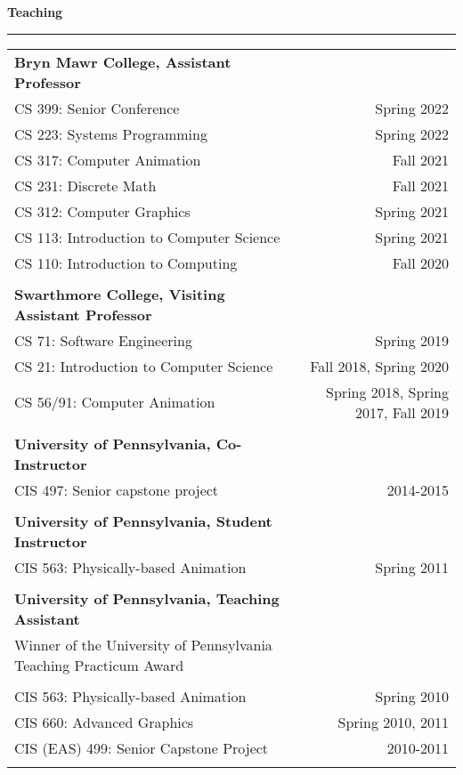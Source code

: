 \needspace{6em}
{\large {\bf Teaching}}
\vspace{0.1cm}
\hrule
\begin{tabular*}{7.1in}{@{}l@{\extracolsep\fill}r}

{\bf Bryn Mawr College, Assistant Professor} & \\
CS 399: Senior Conference & Spring 2022\\
CS 223: Systems Programming & Spring 2022\\
CS 317: Computer Animation & Fall 2021\\
CS 231: Discrete Math & Fall 2021\\
CS 312: Computer Graphics & Spring 2021\\
CS 113: Introduction to Computer Science & Spring 2021\\
CS 110: Introduction to Computing & Fall 2020\\
\phantom{yommomma} & \phantom{2002}\\

{\bf Swarthmore College, Visiting Assistant Professor} & \\
CS 71: Software Engineering & Spring 2019\\
CS 21: Introduction to Computer Science & Fall 2018, Spring 2020\\
CS 56/91: Computer Animation & Spring 2018, Spring 2017, Fall 2019\\
\phantom{yommomma} & \phantom{2002}\\

{\bf University of Pennsylvania, Co-Instructor} & \\
CIS 497: Senior capstone project & 2014-2015\\
\phantom{yommomma} & \phantom{2002}\\

{\bf University of Pennsylvania, Student Instructor} & \\
CIS 563: Physically-based Animation & Spring 2011\\
\phantom{yommomma} & \phantom{2002}\\
{\bf University of Pennsylvania, Teaching Assistant} & \\
Winner of the University of Pennsylvania Teaching Practicum Award & \\
\phantom{yommomma} & \phantom{2002}\\
CIS 563: Physically-based Animation & Spring 2010\\
CIS 660: Advanced Graphics & Spring 2010, 2011\\
CIS (EAS) 499: Senior Capstone Project  & 2010-2011\\
\phantom{yommomma} & \phantom{2002}\\
\end{tabular*}

